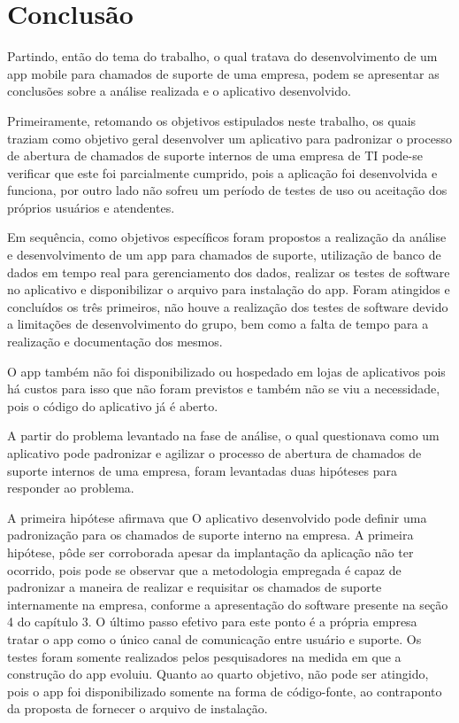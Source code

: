 \chapter*{Conclusão} \label{chap:concl}


Partindo, então do tema do trabalho, o qual tratava do desenvolvimento de um app mobile para chamados de suporte de uma empresa, podem se apresentar as conclusões sobre a análise realizada e o aplicativo desenvolvido.

Primeiramente, retomando os  objetivos estipulados neste trabalho, os quais traziam como objetivo geral desenvolver um aplicativo para padronizar o processo de abertura de chamados de suporte internos de uma empresa de TI pode-se verificar que este foi parcialmente cumprido, pois a aplicação foi desenvolvida e funciona, por outro lado não sofreu um período de testes de uso ou aceitação dos próprios usuários e atendentes.

Em sequência, como objetivos específicos foram propostos a realização da análise e desenvolvimento de um app para chamados de suporte, utilização de banco de dados em tempo real para gerenciamento dos dados, realizar os testes de software no aplicativo e disponibilizar o arquivo para instalação do app. Foram atingidos e concluídos os três primeiros, não houve a realização dos testes de software devido a limitações de desenvolvimento do grupo, bem como a falta de tempo para a realização e documentação dos mesmos. 

O app também não foi disponibilizado ou hospedado em lojas de aplicativos pois há custos para isso que não foram previstos e também não se viu a necessidade, pois o código do aplicativo já é aberto.

A partir do problema levantado na fase de análise, o qual questionava como um aplicativo pode padronizar e agilizar o processo de abertura de chamados de suporte internos de uma empresa, foram levantadas duas hipóteses para responder ao problema.

A primeira hipótese afirmava que O aplicativo desenvolvido pode definir uma padronização para os chamados de suporte interno na empresa. A primeira hipótese, pôde ser corroborada apesar da implantação da aplicação não ter ocorrido, pois pode se observar que a metodologia empregada é capaz de padronizar a maneira de realizar e requisitar os chamados de suporte internamente na empresa, conforme a apresentação do software presente na seção 4 do capítulo 3. O último passo efetivo para este ponto é a própria empresa tratar o app como o único canal de comunicação entre usuário e suporte. Os testes foram somente realizados pelos pesquisadores na medida em que a construção do app evoluiu. Quanto ao quarto objetivo, não pode ser atingido, pois o app foi disponibilizado somente na forma de código-fonte, ao contraponto da proposta de fornecer o arquivo de instalação.

